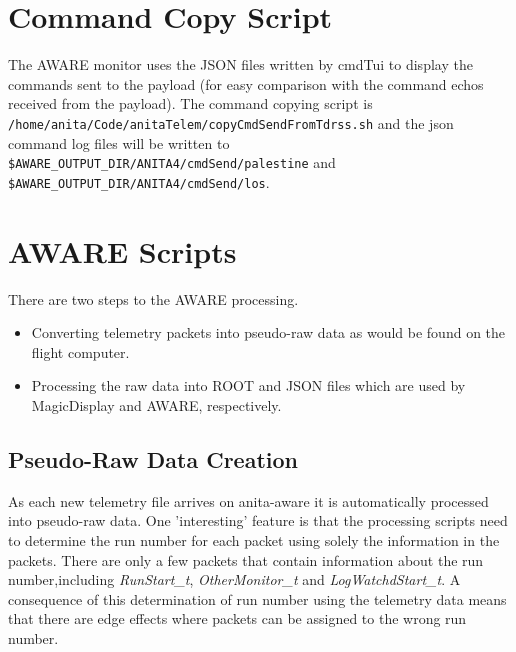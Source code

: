 \documentclass{article}
\begin{document}
\section{Command Copy Script}
The AWARE monitor uses the JSON files written by cmdTui to display the commands sent to the payload (for easy comparison with the command echos received from the payload). The command copying script is \\{\tt /home/anita/Code/anitaTelem/copyCmdSendFromTdrss.sh} and the json command log files will be written to {\tt \$AWARE\_OUTPUT\_DIR/ANITA4/cmdSend/palestine} and {\tt \$AWARE\_OUTPUT\_DIR/ANITA4/cmdSend/los}.

\section{AWARE Scripts}
There are two steps to the AWARE processing.
\begin{itemize}
\item Converting telemetry packets into pseudo-raw data as would be found on the flight computer.
\item Processing the raw data into ROOT and JSON files which are used by MagicDisplay and AWARE, respectively.
\end{itemize}

\subsection{Pseudo-Raw Data Creation}
As each new telemetry file arrives on anita-aware it is automatically processed into pseudo-raw data. One 'interesting' feature is that the processing scripts need to determine the run number for each packet using solely the information in the packets. There are only a few packets that contain information about the run number,including {\it RunStart\_t}, {\it OtherMonitor\_t} and {\it LogWatchdStart\_t}. A consequence of this determination of run number using the telemetry data means that there are edge effects where packets can be assigned to the wrong run number.
\end{document}
